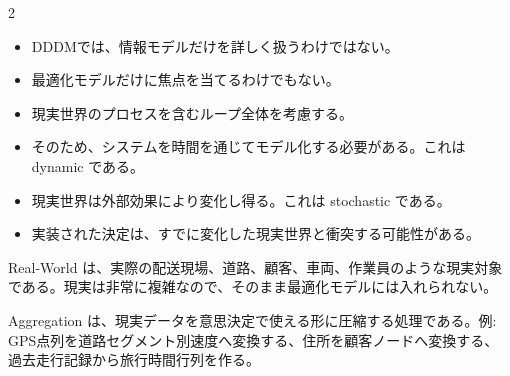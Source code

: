 \clearpage
{}
\begin{multicols}{2}\footnotesize\raggedcolumns
{}
\begin{itemize}
\item DDDMでは、情報モデルだけを詳しく扱うわけではない。
\item 最適化モデルだけに焦点を当てるわけでもない。
\item 現実世界のプロセスを含むループ全体を考慮する。
\item そのため、システムを時間を通じてモデル化する必要がある。これは dynamic である。
\item 現実世界は外部効果により変化し得る。これは stochastic である。
\item 実装された決定は、すでに変化した現実世界と衝突する可能性がある。
\end{itemize}
Real-World は、実際の配送現場、道路、顧客、車両、作業員のような現実対象である。現実は非常に複雑なので、そのまま最適化モデルには入れられない。\par

Aggregation は、現実データを意思決定で使える形に圧縮する処理である。例: GPS点列を道路セグメント別速度へ変換する、住所を顧客ノードへ変換する、過去走行記録から旅行時間行列を作る。\par


\end{multicols}
